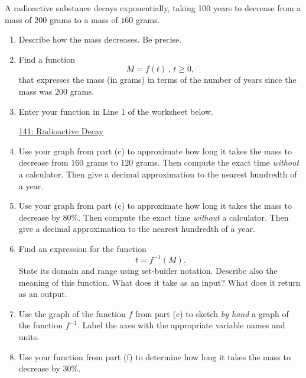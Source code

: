 \documentclass{ximera}
\begin{document}
\begin{question}  \label{Q:dfbhhhhh}
A radioactive substance decays exponentially, taking 100 years to decrease from a mass of $200$ grams to a mass of $160$ grams.

\begin{enumerate}
\item Describe how the mass decreases. Be precise.

\item  Find a function 
\[
 M= f(t) \, , \, t\geq 0 ,
\]
that expresses the mass (in grams) in terms of the number of years since the mass was $200$ grams.

\item Enter your function in Line 1 of the worksheet below. 

\begin{onlineOnly}
    \begin{center}
\end{center}
\end{onlineOnly}


\href{https://www.desmos.com/calculator/uuh05fw3bx}{141: Radioactive Decay}



\item Use your graph from part (c) to approximate how long it takes the mass to decrease from $160$ grams to $120$ grams. Then compute the exact time \emph{without} a calculator. Then give a decimal approximation to the nearest hundredth of a year.

\item Use your graph from part (c) to approximate how long it takes the mass to decrease by $80\%$. Then compute the exact time \emph{without} a calculator. Then give a decimal approximation to the nearest hundredth of a year.

\item Find an expression for the function 
\[ 
      t  = f^{-1}(M) .
\]
State its domain and range using set-buider notation. Describe also the meaning of this function. What does it take as an input? What does it return as an output.

\item Use the graph of the function $f$ from part (c) to sketch \emph{by hand} a graph of the function $f^{-1}$. Label the axes with the appropriate variable names and units.

\item Use your function from part (f) to determine how long it takes the mass to decrease by $30\%$.

\end{enumerate}
\end{question}
\end{document}
